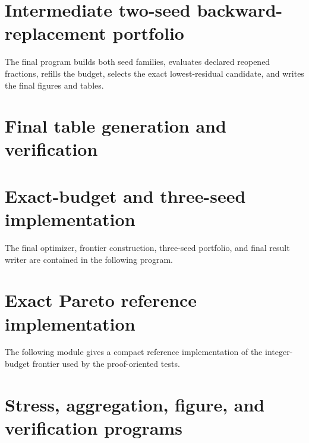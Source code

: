 \documentclass[11pt]{article}
\theoremstyle{definition}
\theoremstyle{remark}
\begin{document}


\section{Intermediate two-seed backward-replacement portfolio}
The final program builds both seed families, evaluates declared reopened fractions, refills the budget, selects the exact lowest-residual candidate, and writes the final figures and tables.



\section{Final table generation and verification}



\section{Exact-budget and three-seed implementation}
The final optimizer, frontier construction, three-seed portfolio, and final result writer are contained in the following program.



\section{Exact Pareto reference implementation}
The following module gives a compact reference implementation of the integer-budget frontier used by the proof-oriented tests.



\section{Stress, aggregation, figure, and verification programs}






\end{document}
